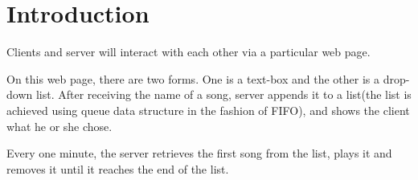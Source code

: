 \section*{Introduction}
Clients and server will interact with each other via a particular web page.

On this web page, there are two forms. One is a text-box and the other is a drop-down list. After receiving the name of a song, server appends it to a list(the list is achieved using queue data structure in the fashion of FIFO), and shows the client what he or she chose.

Every one minute, the server retrieves the first song from the list, plays it and removes it until it reaches the end of the list.
 

